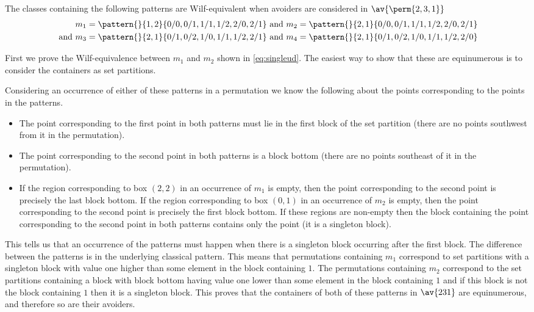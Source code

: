 \subsection{}
\nextvar
The classes containing the following patterns are Wilf-equivalent
when avoiders are considered in \(\av{\perm{2,3,1}}\)
\begin{align}
    m_1 = \pattern{}{1,2}{0/0,0/1,1/1,1/2,2/0,2/1} &\text{ and }
    m_2 = \pattern{}{2,1}{0/0,0/1,1/1,1/2,2/0,2/1} \label{eq:singleud}\\
    \text{ and }
    m_3 = \pattern{}{2,1}{0/1,0/2,1/0,1/1,1/2,2/1} &\text{ and }
    m_4 = \pattern{}{2,1}{0/1,0/2,1/0,1/1,1/2,2/0} \label{eq:other}
\end{align}

First we prove the Wilf-equivalence between \(m_1\) and \(m_2\) shown in
\eqref{eq:singleud}. The easiest way to
show that these are equinumerous is to consider the containers as set partitions.

Considering an occurrence of either of these patterns in a permutation  we know
the following about the points corresponding to the points in the patterns.
\begin{itemize}
    \item The point corresponding to the first point in both patterns
        must lie in the first block of the set partition (there are
        no points southwest from it in the permutation).
    \item The point corresponding to the second point in both patterns
        is a block bottom (there are no points southeast of it in
        the permutation).
    \item If the region corresponding to box \((2,2)\) in an occurrence of
    \(m_1\) is empty, then the point corresponding to the second point is
    precisely the last block bottom. If the region corresponding to box \((0,1)\)
    in an occurrence of \(m_2\) is empty, then the point corresponding to the
    second point is precisely the first block bottom.
    If these regions are non-empty then the block containing the point
    corresponding to the second point in both patterns contains only the point
    (it is a singleton block).
\end{itemize}
This tells us that an occurrence of the patterns must happen when there
is a singleton block occurring after the first block. The difference
between the patterns is in the underlying classical pattern. This
means that permutations containing \(m_1\) correspond to set partitions
with a singleton block with value one higher than some element in the
block containing \(1\). The permutations containing \(m_2\) correspond
to the set partitions containing a block with block bottom having value
one lower than some element in the block containing \(1\) and if this
block is not the block containing \(1\) then it is a singleton block. This
proves that the containers of both of these patterns in \(\av{231}\) are
equinumerous, and therefore so are their avoiders.

